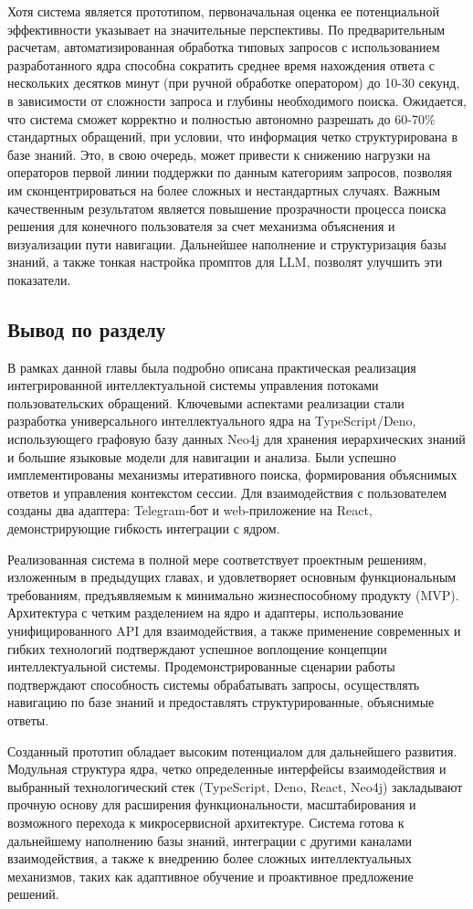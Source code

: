 Хотя система является прототипом, первоначальная оценка ее потенциальной эффективности указывает на значительные перспективы. По предварительным расчетам, автоматизированная обработка типовых запросов с использованием разработанного ядра способна сократить среднее время нахождения ответа с нескольких десятков минут (при ручной обработке оператором) до 10-30 секунд, в зависимости от сложности запроса и глубины необходимого поиска. Ожидается, что система сможет корректно и полностью автономно разрешать до 60-70\% стандартных обращений, при условии, что информация четко структурирована в базе знаний. Это, в свою очередь, может привести к снижению нагрузки на операторов первой линии поддержки по данным категориям запросов, позволяя им сконцентрироваться на более сложных и нестандартных случаях. Важным качественным результатом является повышение прозрачности процесса поиска решения для конечного пользователя за счет механизма объяснения и визуализации пути навигации. Дальнейшее наполнение и структуризация базы знаний, а также тонкая настройка промптов для LLM, позволят улучшить эти показатели.

\subsection{Вывод по разделу}

В рамках данной главы была подробно описана практическая реализация интегрированной интеллектуальной системы управления потоками пользовательских обращений. Ключевыми аспектами реализации стали разработка универсального интеллектуального ядра на TypeScript/Deno, использующего графовую базу данных Neo4j для хранения иерархических знаний и большие языковые модели для навигации и анализа. Были успешно имплементированы механизмы итеративного поиска, формирования объяснимых ответов и управления контекстом сессии. Для взаимодействия с пользователем созданы два адаптера: Telegram-бот и  web-приложение на React, демонстрирующие гибкость интеграции с ядром.

Реализованная система в полной мере соответствует проектным решениям, изложенным в предыдущих главах, и удовлетворяет основным функциональным требованиям, предъявляемым к минимально жизнеспособному продукту (MVP). Архитектура с четким разделением на ядро и адаптеры, использование унифицированного API для взаимодействия, а также применение современных и гибких технологий подтверждают успешное воплощение концепции интеллектуальной системы. Продемонстрированные сценарии работы подтверждают способность системы обрабатывать запросы, осуществлять навигацию по базе знаний и предоставлять структурированные, объяснимые ответы.

Созданный прототип обладает высоким потенциалом для дальнейшего развития. Модульная структура ядра, четко определенные интерфейсы взаимодействия и выбранный технологический стек (TypeScript, Deno, React, Neo4j) закладывают прочную основу для расширения функциональности, масштабирования и возможного перехода к микросервисной архитектуре. Система готова к дальнейшему наполнению базы знаний, интеграции с другими каналами взаимодействия, а также к внедрению более сложных интеллектуальных механизмов, таких как адаптивное обучение и проактивное предложение решений.